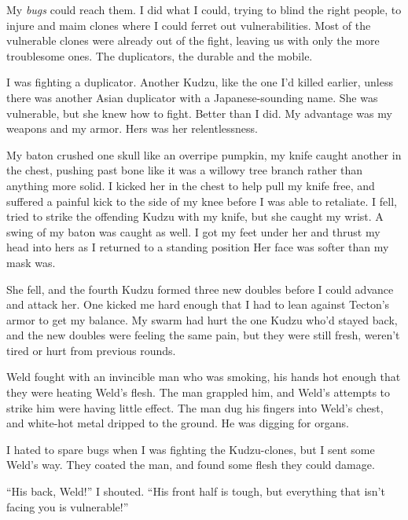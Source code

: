 My \emph{bugs}\emph{ }could reach them.  I did what I could, trying to blind the right people, to injure and maim clones where I could ferret out vulnerabilities.  Most of the vulnerable clones were already out of the fight, leaving us with only the more troublesome ones.  The duplicators, the durable and the mobile.



I was fighting a duplicator.  Another Kudzu, like the one I'd killed earlier, unless there was another Asian duplicator with a Japanese-sounding name.  She was vulnerable, but she knew how to fight.  Better than I did.  My advantage was my weapons and my armor.  Hers was her relentlessness.



My baton crushed one skull like an overripe pumpkin, my knife caught another in the chest, pushing past bone like it was a willowy tree branch rather than anything more solid.  I kicked her in the chest to help pull my knife free, and suffered a painful kick to the side of my knee before I was able to retaliate.  I fell, tried to strike the offending Kudzu with my knife, but she caught my wrist.  A swing of my baton was caught as well.  I got my feet under her and thrust my head into hers as I returned to a standing position  Her face was softer than my mask was.



She fell, and the fourth Kudzu formed three new doubles before I could advance and attack her.  One kicked me hard enough that I had to lean against Tecton's armor to get my balance.  My swarm had hurt the one Kudzu who'd stayed back, and the new doubles were feeling the same pain, but they were still fresh, weren't tired or hurt from previous rounds.



Weld fought with an invincible man who was smoking, his hands hot enough that they were heating Weld's flesh.  The man grappled him, and Weld's attempts to strike him were having little effect.  The man dug his fingers into Weld's chest, and white-hot metal dripped to the ground.  He was digging for organs.



I hated to spare bugs when I was fighting the Kudzu-clones, but I sent some Weld's way.  They coated the man, and found some flesh they could damage.



``His back, Weld!'' I shouted.  ``His front half is tough, but everything that isn't facing you is vulnerable!''



